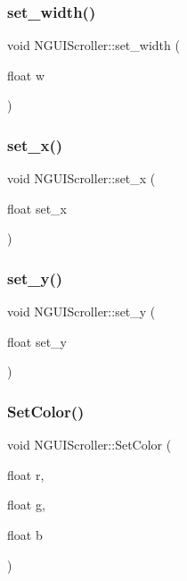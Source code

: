 \subsubsection{\texorpdfstring{set\+\_\+width()}{set\_width()}}
{\footnotesize\ttfamily void N\+G\+U\+I\+Scroller\+::set\+\_\+width (\begin{DoxyParamCaption}\item[{float}]{w }\end{DoxyParamCaption})}

\hypertarget{class_n_g_u_i_scroller_ac1688e059dceb1e4088e2c54dce044ff}{}\label{class_n_g_u_i_scroller_ac1688e059dceb1e4088e2c54dce044ff} 
\subsubsection{\texorpdfstring{set\+\_\+x()}{set\_x()}}
{\footnotesize\ttfamily void N\+G\+U\+I\+Scroller\+::set\+\_\+x (\begin{DoxyParamCaption}\item[{float}]{set\+\_\+x }\end{DoxyParamCaption})}

\hypertarget{class_n_g_u_i_scroller_aca1d8d5ed78e5299d6bd170f2e2b4e78}{}\label{class_n_g_u_i_scroller_aca1d8d5ed78e5299d6bd170f2e2b4e78} 
\subsubsection{\texorpdfstring{set\+\_\+y()}{set\_y()}}
{\footnotesize\ttfamily void N\+G\+U\+I\+Scroller\+::set\+\_\+y (\begin{DoxyParamCaption}\item[{float}]{set\+\_\+y }\end{DoxyParamCaption})}

\hypertarget{class_n_g_u_i_scroller_a7ad461d068758753269a160cd246018d}{}\label{class_n_g_u_i_scroller_a7ad461d068758753269a160cd246018d} 
\subsubsection{\texorpdfstring{Set\+Color()}{SetColor()}\hspace{0.1cm}{\footnotesize\ttfamily [1/2]}}
{\footnotesize\ttfamily void N\+G\+U\+I\+Scroller\+::\+Set\+Color (\begin{DoxyParamCaption}\item[{float}]{r,  }\item[{float}]{g,  }\item[{float}]{b }\end{DoxyParamCaption})}

